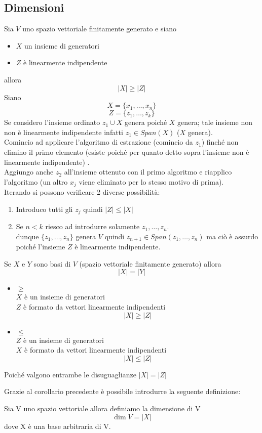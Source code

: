 \subsection{Dimensioni}
\begin{prop} Sia $V$ uno spazio vettoriale finitamente generato e siano 
 \begin{itemize}
\item $X$ un insieme di generatori 
\item $Z$ è linearmente indipendente
\end{itemize}
allora $$\vert X \vert \geq \vert Z \vert $$
\proof Siano $$ X=\{ x_1, \dots , x_n \} $$ 
$$ Z=\{ z_1, \dots , z_k \}$$
Se considero l'insieme ordinato  $ {z_1} \cup X $ genera poiché $X$ genera; tale insieme non non è linearmente indipendente infatti $z_1 \in Span (X)$ ($X$ genera).\\
Comincio ad applicare l'algoritmo di estrazione (comincio da $z_1$) finché non elimino il primo elemento (esiste poiché per quanto detto sopra l'insieme non è linearmente indipendente) .\\ Aggiungo anche $z_2$ all'insieme ottenuto con il primo algoritmo e riapplico l'algoritmo (un altro $x_j$ viene eliminato per lo stesso motivo di prima).\\
Iterando si possono verificare 2 diverse possibilità:
\begin{enumerate}
\item Introduco tutti gli $z_j$ quindi $\vert Z \vert  \leq \vert  X \vert $
\item Se $n < k $ riesco ad introdurre solamente $z_1, \dots, z_n $.\\
 dunque $\{ z_1, \dots, z_n \} $ genera  $V$  quindi $z_{n+1} \in Span(z_1,\dots , z_n) $ ma ciò è assurdo poiché l'insieme $Z$ è linearmente indipendente.
\end{enumerate}
\endproof
\end{prop}
\begin{cor} Se $X$ e $Y$ sono basi di $V$ (spazio vettoriale finitamente generato) allora 
$$ \vert X  \vert = \vert Y \vert$$
\proof\bbianco
\begin{itemize}
\item $ \geq $ 
\\
$X$ \`e un insieme di generatori \\
$Z$ è formato da vettori linearmente indipendenti $$\vert X  \vert \geq \vert Z \vert$$
\item $\leq $\\
$Z$ \`e un insieme di generatori \\
$X$ è formato da vettori linearmente indipendenti
 $$\vert X\vert \leq \vert Z \vert $$
\end{itemize}
Poiché valgono entrambe le disuguaglianze $\vert X  \vert= \vert Z \vert $
\endproof
\end{cor}
Grazie al  corollario precedente è possibile introdurre la seguente definizione:
\begin{defn}[Dimensione] \bianco Sia V uno spazio vettoriale allora definiamo la dimensione di V
 $$ \dim V= \vert X \vert $$ 
 dove X è una base arbitraria di V.
\end{defn}
\newpage

